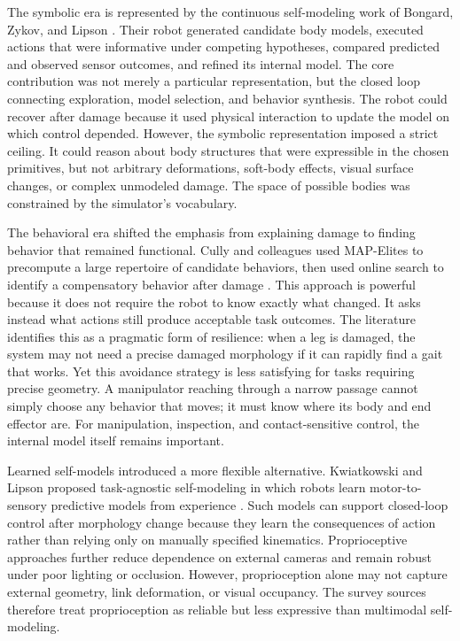 \documentclass[12pt,a4paper,oneside]{report}
\begin{document}
The symbolic era is represented by the continuous self-modeling work of Bongard, Zykov, and Lipson \cite{bongard2006resilient}. Their robot generated candidate body models, executed actions that were informative under competing hypotheses, compared predicted and observed sensor outcomes, and refined its internal model. The core contribution was not merely a particular representation, but the closed loop connecting exploration, model selection, and behavior synthesis. The robot could recover after damage because it used physical interaction to update the model on which control depended. However, the symbolic representation imposed a strict ceiling. It could reason about body structures that were expressible in the chosen primitives, but not arbitrary deformations, soft-body effects, visual surface changes, or complex unmodeled damage. The space of possible bodies was constrained by the simulator's vocabulary.

The behavioral era shifted the emphasis from explaining damage to finding behavior that remained functional. Cully and colleagues used MAP-Elites to precompute a large repertoire of candidate behaviors, then used online search to identify a compensatory behavior after damage \cite{cully2015robots,mouret2015illuminating}. This approach is powerful because it does not require the robot to know exactly what changed. It asks instead what actions still produce acceptable task outcomes. The literature identifies this as a pragmatic form of resilience: when a leg is damaged, the system may not need a precise damaged morphology if it can rapidly find a gait that works. Yet this avoidance strategy is less satisfying for tasks requiring precise geometry. A manipulator reaching through a narrow passage cannot simply choose any behavior that moves; it must know where its body and end effector are. For manipulation, inspection, and contact-sensitive control, the internal model itself remains important.

Learned self-models introduced a more flexible alternative. Kwiatkowski and Lipson proposed task-agnostic self-modeling in which robots learn motor-to-sensory predictive models from experience \cite{kwiatkowski2019task}. Such models can support closed-loop control after morphology change because they learn the consequences of action rather than relying only on manually specified kinematics. Proprioceptive approaches further reduce dependence on external cameras and remain robust under poor lighting or occlusion. However, proprioception alone may not capture external geometry, link deformation, or visual occupancy. The survey sources therefore treat proprioception as reliable but less expressive than multimodal self-modeling.
\end{document}
